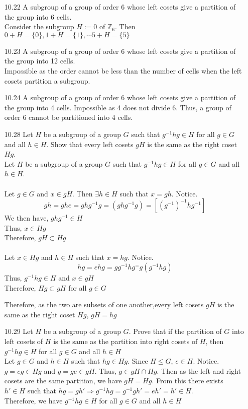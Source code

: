 \documentclass[12pt]{article}
\newcommand{\Z}{\mathds{Z}}
\begin{document}
\begin{enumerate}
	 \item[10.22] A subgroup of a group of order 6 whose left cosets give a partition of the group into 6 cells.\\
	 Consider the subgroup $ H := {0} $ of $ \Z_6 $. Then $ 0 + H = \{0\}, 1+H=\{1\},\cdots5+H=\{5\} $
	 \item[10.23] A subgroup of a group of order 6 whose left cosets give a partition of the group into 12 cells.\\
	 Impossible as the order cannot be less than the number of cells when the left cosets partition a subgroup.
	 \item[10.24] A subgroup of a group of order 6 whose left cosets give a partition of the group into 4 cells.
	 Impossible as 4 does not divide 6. Thus, a group of order 6 cannot be partitioned into 4 cells.
	 \item[10.28] Let $ H $ be a subgroup of a group $ G $ such that $ g^{-1}hg \in H $ for all $ g\in G $ and all $ h \in H $. Show that every left cosets $ gH $ is the same as the right coset $ Hg $.\\
	  Let $ H $ be a subgroup of a group $ G $ such that $ g^{-1}hg \in H $ for all $ g\in G $ and all $ h \in H $. \\
	  \\
	  Let $ g\in G $ and $ x\in gH $. Then $ \exists h\in H  $ such that $ x=gh $. Notice. 
	  \[gh=ghe=ghg^{-1}g=(ghg^{-1}g)=[(g^{-1})^{-1}hg^{-1}]\] 
	 We then have, $ ghg^{-1}\in H $\\
	 Thus, $ x\in Hg $\\
	 Therefore, $ gH \subset Hg $\\
	 \\
	 Let $ x \in Hg $ and $ h \in H $ such that $ x = hg $. Notice.
	 \[hg=ehg=gg^{-1}hg^=g(g^{-1}hg)\]
	 Thus, $ g^{-1}hg\in H $ and $ x\in gH $\\
	 Therefore, $ Hg \subset gH $ for all $ g \in G $
	 
	 Therefore, as the two are subsets of one another,every left cosets $ gH $ is the same as the right coset $ Hg $, $gH= hg$\\
	 \item[10.29] Let $ H $ be a subgroup of a group $ G $. Prove that if the partition of $ G $ into left cosets of $ H $ is the same as the partition into right cosets of $ H $, then $ g^{-1}hg\in H $ for all $ g\in G $ and all $ h\in H $\\
	 
	 Let $ g\in G $ and $ h \in H $ such that $ hg \in Hg $. Since $ H \leq G $, $ e \in H $. Notice. $ g = eg\in Hg $ and $ g = ge\in gH $. Thus, $ g \in gH \cap Hg $. Then as the left and right cosets are the same partition, we have $ gH = Hg $. From this there exists $ h'\in H $ such that $ hg = gh' \Rightarrow g^{-1}hg=g^{-1}gh'=eh'=h'\in H$.\\
	 Therefore, we have $ g^{-1}hg\in H $ for all $ g\in G $ and all $ h\in H $
	 

\end{enumerate}
\end{document}
